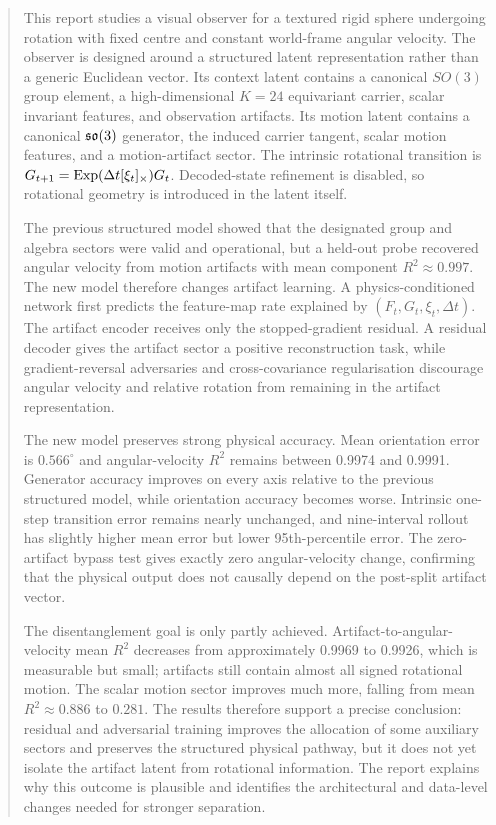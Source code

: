 \documentclass[11pt,a4paper]{article}
\begin{document}
\begin{abstract}
This report studies a visual observer for a textured rigid sphere undergoing rotation with fixed centre and constant world-frame angular velocity. The observer is designed around a structured latent representation rather than a generic Euclidean vector. Its context latent contains a canonical $SO(3)$ group element, a high-dimensional $K=24$ equivariant carrier, scalar invariant features, and observation artifacts. Its motion latent contains a canonical $\so(3)$ generator, the induced carrier tangent, scalar motion features, and a motion-artifact sector. The intrinsic rotational transition is $G_{t+1}=\Exp(\Delta t[\xi_t]_\times)G_t$. Decoded-state refinement is disabled, so rotational geometry is introduced in the latent itself.

The previous structured model showed that the designated group and algebra sectors were valid and operational, but a held-out probe recovered angular velocity from motion artifacts with mean component $R^2\approx0.997$. The new model therefore changes artifact learning. A physics-conditioned network first predicts the feature-map rate explained by $(F_t,G_t,\xi_t,\Delta t)$. The artifact encoder receives only the stopped-gradient residual. A residual decoder gives the artifact sector a positive reconstruction task, while gradient-reversal adversaries and cross-covariance regularisation discourage angular velocity and relative rotation from remaining in the artifact representation.

The new model preserves strong physical accuracy. Mean orientation error is $0.566^\circ$ and angular-velocity $R^2$ remains between 0.9974 and 0.9991. Generator accuracy improves on every axis relative to the previous structured model, while orientation accuracy becomes worse. Intrinsic one-step transition error remains nearly unchanged, and nine-interval rollout has slightly higher mean error but lower 95th-percentile error. The zero-artifact bypass test gives exactly zero angular-velocity change, confirming that the physical output does not causally depend on the post-split artifact vector.

The disentanglement goal is only partly achieved. Artifact-to-angular-velocity mean $R^2$ decreases from approximately 0.9969 to 0.9926, which is measurable but small; artifacts still contain almost all signed rotational motion. The scalar motion sector improves much more, falling from mean $R^2\approx0.886$ to $0.281$. The results therefore support a precise conclusion: residual and adversarial training improves the allocation of some auxiliary sectors and preserves the structured physical pathway, but it does not yet isolate the artifact latent from rotational information. The report explains why this outcome is plausible and identifies the architectural and data-level changes needed for stronger separation.
\end{abstract}
\tableofcontents\clearpage
\end{document}
